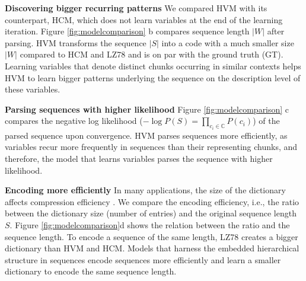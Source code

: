 \documentclass{article} %
\theoremstyle{remark}
\begin{document}
\textbf{Discovering bigger recurring patterns}
We compared HVM with its counterpart, HCM, which does not learn variables at the end of the learning iteration. Figure \ref{fig:modelcomparison} b compares sequence length $|W|$ after parsing. HVM transforms the sequence $|S|$ into a code with a much smaller size $|W|$ compared to HCM and LZ78 and is on par with the ground truth (GT). Learning variables that denote distinct chunks occurring in similar contexts helps HVM to learn bigger patterns underlying the sequence on the description level of these variables. 

\textbf{Parsing sequences with higher likelihood}  Figure \ref{fig:modelcomparison} c compares the negative log likelihood ($-\log P(S) = \prod_{c_i \in \mathbb{C}} P(c_i)$) of the parsed sequence upon convergence. HVM parses sequences more efficiently, as variables recur more frequently in sequences than their representing chunks, and therefore, the model that learns variables parses the sequence with higher likelihood.  %

\textbf{Encoding more efficiently}
In many applications, the size of the dictionary affects compression efficiency \citep{Navarro2007,Ferragina2005}.  We compare the encoding efficiency, i.e., the ratio between the dictionary size (number of entries) and the original sequence length $S$. Figure \ref{fig:modelcomparison}d shows the relation between the ratio and the sequence length. To encode a sequence of the same length, LZ78 creates a bigger dictionary than HVM and HCM. Models that harness the embedded hierarchical structure in sequences encode sequences more efficiently and learn a smaller dictionary to encode the same sequence length. 
\end{document}
